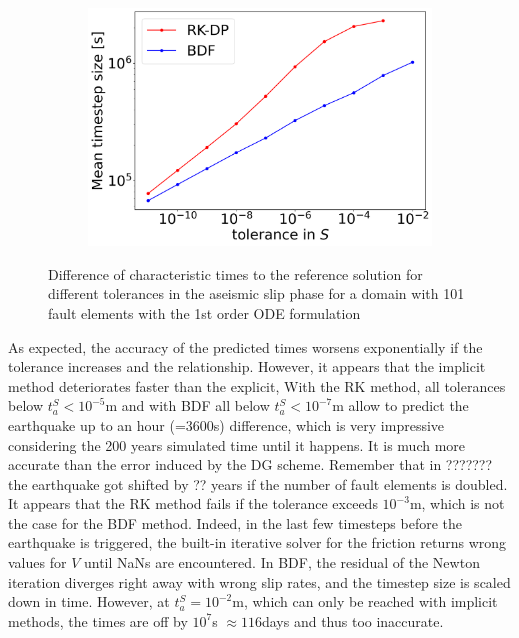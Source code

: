 \begin{figure}[H]
\begin{subfigure}[t]{0.32\textwidth}
		\includegraphics[width=1\textwidth]{images/TANDEMcompactODEDifferentTolerancesSize101_AS_DT.png}
	\end{subfigure}
	\caption{Difference of characteristic times to the reference solution for different tolerances in the aseismic slip phase for a domain with 101 fault elements with the 1st order ODE formulation}
	\label{fig:tolerancesAseismicSlip_compactODE}
\end{figure}

As expected, the accuracy of the predicted times worsens exponentially if the tolerance increases and the relationship. However, it appears that the implicit method deteriorates faster than the explicit,  With the RK method, all tolerances below $t_a^S<10^{-5}$m  and with BDF all below $t_a^S<10^{-7}$m allow to predict the earthquake up to an hour (=3600s) difference, which is very impressive considering the 200 years simulated time until it happens. It is much more accurate than the error induced by the DG scheme. Remember that in ??????? the earthquake got shifted by ?? years if the number of fault elements is doubled. It appears that the RK method fails if the tolerance exceeds $10^{-3}$m, which is not the case for the BDF method. Indeed, in the last few timesteps before the earthquake is triggered, the built-in iterative solver for the friction returns wrong values for $V$ until NaNs are encountered. In BDF, the residual of the Newton iteration diverges right away with wrong slip rates, and the timestep size is scaled down in time. However, at $t_a^S = 10^{-2}$m, which can only be reached with implicit methods, the times are off by $10^7$s $\approx 116$days and thus too inaccurate. \\

